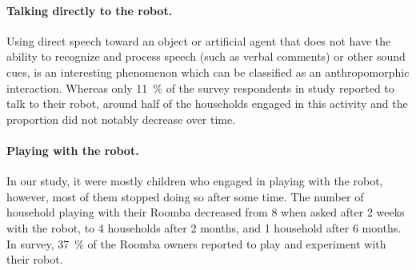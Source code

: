 \documentclass{frontiersSCNS} %
\begin{document}
\paragraph*{Talking directly to the robot.} Using direct speech toward an object or artificial agent that does not have the ability to recognize and process speech (such as verbal comments) or other sound cues, is an interesting phenomenon which can be classified as an anthropomorphic interaction. Whereas only 11~\% of the survey respondents in \cite{sung_housewives_2008} study reported to talk to their robot, around half of the households engaged in this activity and the proportion did not notably decrease over time. 

\paragraph*{Playing with the robot.} In our study, it were mostly children who engaged in playing with the robot, however, most of them stopped doing so after some time. The number of household playing with their Roomba decreased from 8 when asked after 2 weeks with the robot, to 4 households after 2 months, and 1 household after 6 months. In \cite{sung_housewives_2008} survey, 37~\% of the Roomba owners reported to play and experiment with their robot.\\ 

\end{document}
